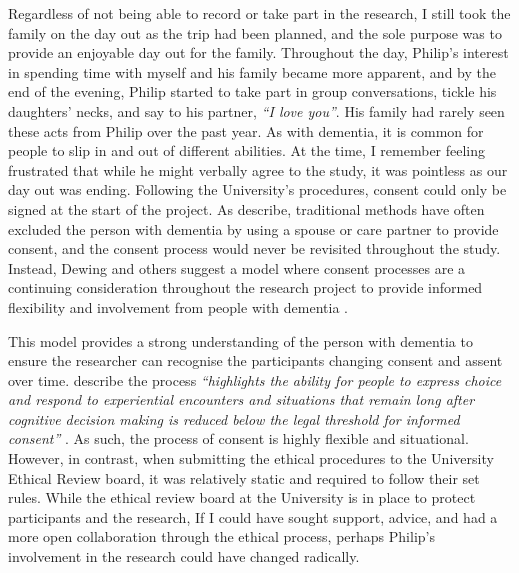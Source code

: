 Regardless of not being able to record or take part in the research, I still took the family on the day out as the trip had been planned, and the sole purpose was to provide an enjoyable day out for the family. Throughout the day, Philip's interest in spending time with myself and his family became more apparent, and by the end of the evening, Philip started to take part in group conversations, tickle his daughters' necks, and say to his partner, \textit{``I love you''}. His family had rarely seen these acts from Philip over the past year. As with dementia, it is common for people to slip in and out of different abilities. At the time, I remember feeling frustrated that while he might verbally agree to the study, it was pointless as our day out was ending. Following the University's procedures, consent could only be signed at the start of the project. As \cite{dewing_participatory_2007} describe, traditional methods have often excluded the person with dementia by using a spouse or care partner to provide consent, and the consent process would never be revisited throughout the study. Instead, Dewing and others suggest a model where consent processes are a continuing consideration throughout the research project to provide informed flexibility and involvement from people with dementia \citep{dewing_participatory_2007,slaughter2007consent,mckeown_actively_2009}.

This model provides a strong understanding of the person with dementia to ensure the researcher can recognise the participants changing consent and assent over time. \cite{haraldsdottir2019relational} describe the process \textit{``highlights the ability for people to express choice and respond to experiential encounters and situations that remain long after cognitive decision making is reduced below the legal threshold for informed consent''} \citep[pg. 4]{haraldsdottir2019relational}. As such, the process of consent is highly flexible and situational. However, in contrast, when submitting the ethical procedures to the University Ethical Review board, it was relatively static and required to follow their set rules. While the ethical review board at the University is in place to protect participants and the research, If I could have sought support, advice, and had a more open collaboration through the ethical process, perhaps Philip's involvement in the research could have changed radically.

